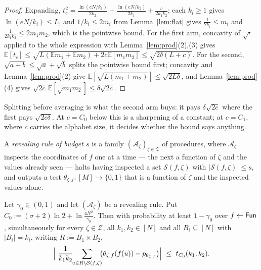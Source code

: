 \documentclass{aicr-solution}
\newcommand{\Fun}{\mathsf{Fun}}
\newcommand{\Exp}{\mathbb{E}}
\newcommand{\bits}{\{0,1\}}
\begin{document}
\begin{proof}
Expanding,
$t_c^{2}=\frac{\ln(eN/k_1)}{2k_2}+\frac{\ln(eN/k_2)}{2k_1}+\frac{c}{2k_1k_2}$; each
$k_i\ge1$ gives $\ln(eN/k_i)\le L$, and $1/k_i\le2m_i$ from Lemma~\ref{lem:flat}
gives $\frac1{2k_i}\le m_i$ and $\frac1{2k_1k_2}\le2m_1m_2$, which is the pointwise
bound. For the first arm, concavity of $\sqrt\cdot$ applied to the whole expression
with Lemma~\ref{lem:prod}(2),(3) gives
$\Exp[t_c]\le\sqrt{L(\Exp m_1+\Exp m_2)+2c\Exp[m_1m_2]}\le\sqrt{2\delta(L+c)}$. For
the second, $\sqrt{a+b}\le\sqrt a+\sqrt b$ splits the pointwise bound first;
concavity and Lemma~\ref{lem:prod}(2) give
$\Exp[\sqrt{L(m_1+m_2)}]\le\sqrt{2L\delta}$, and Lemma~\ref{lem:prod}(4) gives
$\sqrt{2c}\,\Exp[\sqrt{m_1m_2}]\le\delta\sqrt{2c}$.
\end{proof}

Splitting before averaging is what the second arm buys: it pays $\delta\sqrt{2c}$
where the first pays $\sqrt{2c\delta}$. At $c=C_0$ below this is a sharpening of a
constant; at $c=C_1$, where $c$ carries the alphabet size, it decides whether the
bound says anything.

\begin{definition}\label{def:rr}
A \emph{revealing rule of budget $s$} is a family
$(\mathcal A_\zeta)_{\zeta\in\mathcal Z}$ of procedures, where $\mathcal A_\zeta$
inspects the coordinates of $f$ one at a time --- the next a function of $\zeta$
and the values already seen --- halts having inspected a set
$\mathcal S(f,\zeta)$ with $|\mathcal S(f,\zeta)|\le s$, and outputs a test
$\theta_{\zeta,f}:[M]\to\bits$ that is a function of $\zeta$ and the inspected
values alone.
\end{definition}

\begin{lemma}\label{lem:disc}
Let $\gamma_0\in(0,1)$ and let $(\mathcal A_\zeta)$ be a revealing rule. Put
$C_0:=(\sigma+2)\ln2+\ln\frac{4N^{2}}{\gamma_0}$. Then with probability at least
$1-\gamma_0$ over $f\sample\Fun$, simultaneously
for every $\zeta\in\mathcal Z$, all $k_1,k_2\in[N]$ and all $B_i\subseteq[N]$
with $|B_i|=k_i$, writing $R:=B_1\times B_2$,
\begin{equation}\label{eq:disc}
  \Bigl|\ \frac{1}{k_1k_2}\!\!\sum_{u\in R\setminus\mathcal S(f,\zeta)}\!\!
  \bigl(\theta_{\zeta,f}(f(u))-p_{\theta_{\zeta,f}}\bigr)\Bigr|\ \le\ t_{C_0}(k_1,k_2).
\end{equation}
\end{lemma}
\end{document}

